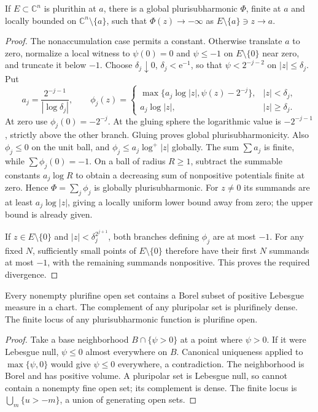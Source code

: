 \begin{proposition}\label{prop:global-plurithin-witness}
If $E\subset\mathbb C^n$ is plurithin at $a$, there is a global plurisubharmonic $\Phi$, finite at $a$ and locally bounded on $\mathbb C^n\setminus\{a\}$, such that $\Phi(z)\to-\infty$ as $E\setminus\{a\}\ni z\to a$.
\end{proposition}
\begin{proof}
The nonaccumulation case permits a constant. Otherwise translate $a$ to zero, normalize a local witness to $\psi(0)=0$ and $\psi\le-1$ on $E\setminus\{0\}$ near zero, and truncate it below $-1$. Choose $\delta_j\downarrow0$, $\delta_j<\mathrm e^{-1}$, so that $\psi<2^{-j-2}$ on $|z|\le\delta_j$. Put
\[
 a_j=\frac{2^{-j-1}}{|\log\delta_j|},\qquad
 \phi_j(z)=
 \begin{cases}
 \max\{a_j\log|z|,\psi(z)-2^{-j}\},&|z|<\delta_j,\\
 a_j\log|z|,&|z|\ge\delta_j.
 \end{cases}
\]
At zero use $\phi_j(0)=-2^{-j}$. At the gluing sphere the logarithmic value is $-2^{-j-1}$, strictly above the other branch. Gluing proves global plurisubharmonicity. Also $\phi_j\le0$ on the unit ball, and $\phi_j\le a_j\log^+|z|$ globally. The sum $\sum a_j$ is finite, while $\sum\phi_j(0)=-1$. On a ball of radius $R\ge1$, subtract the summable constants $a_j\log R$ to obtain a decreasing sum of nonpositive potentials finite at zero. Hence $\Phi=\sum_j\phi_j$ is globally plurisubharmonic. For $z\ne0$ its summands are at least $a_j\log|z|$, giving a locally uniform lower bound away from zero; the upper bound is already given.

If $z\in E\setminus\{0\}$ and $|z|<\delta_j^{2^{j+1}}$, both branches defining $\phi_j$ are at most $-1$. For any fixed $N$, sufficiently small points of $E\setminus\{0\}$ therefore have their first $N$ summands at most $-1$, with the remaining summands nonpositive. This proves the required divergence.
\end{proof}

\begin{proposition}\label{prop:plurifine-positive-volume}
Every nonempty plurifine open set contains a Borel subset of positive Lebesgue measure in a chart. The complement of any pluripolar set is plurifinely dense. The finite locus of any plurisubharmonic function is plurifine open.
\end{proposition}
\begin{proof}
Take a base neighborhood $B\cap\{\psi>0\}$ at a point where $\psi>0$. If it were Lebesgue null, $\psi\le0$ almost everywhere on $B$. Canonical uniqueness applied to $\max\{\psi,0\}$ would give $\psi\le0$ everywhere, a contradiction. The neighborhood is Borel and has positive volume. A pluripolar set is Lebesgue null, so cannot contain a nonempty fine open set; its complement is dense. The finite locus is $\bigcup_m\{u>-m\}$, a union of generating open sets.
\end{proof}

